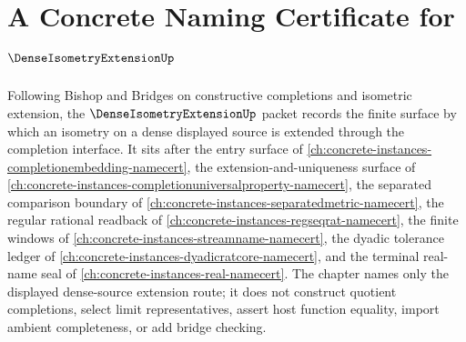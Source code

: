 \chapter{A Concrete Naming Certificate for $\DenseIsometryExtensionUp$}
\label{ch:concrete-instances-dense-isometry-extension-namecert}

Following Bishop and Bridges on constructive completions and isometric extension, the $\DenseIsometryExtensionUp$ packet records the finite surface by which an isometry on a dense displayed source is extended through the completion interface. It sits after the entry surface of \autoref{ch:concrete-instances-completionembedding-namecert}, the extension-and-uniqueness surface of \autoref{ch:concrete-instances-completionuniversalproperty-namecert}, the separated comparison boundary of \autoref{ch:concrete-instances-separatedmetric-namecert}, the regular rational readback of \autoref{ch:concrete-instances-regseqrat-namecert}, the finite windows of \autoref{ch:concrete-instances-streamname-namecert}, the dyadic tolerance ledger of \autoref{ch:concrete-instances-dyadicratcore-namecert}, and the terminal real-name seal of \autoref{ch:concrete-instances-real-namecert}. The chapter names only the displayed dense-source extension route; it does not construct quotient completions, select limit representatives, assert host function equality, import ambient completeness, or add bridge checking.

